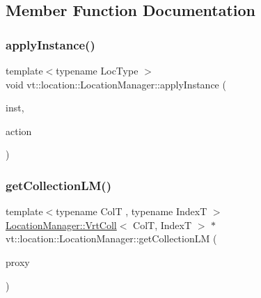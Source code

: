 \subsection{Member Function Documentation}
\mbox{\label{structvt_1_1location_1_1_location_manager_ae87fb969a0c0e2a45ca3ff15a0f01c00}} 
\subsubsection{\texorpdfstring{apply\+Instance()}{applyInstance()}}
{\footnotesize\ttfamily template$<$typename Loc\+Type $>$ \\
void vt\+::location\+::\+Location\+Manager\+::apply\+Instance (\begin{DoxyParamCaption}\item[{\hyperlink{namespacevt_1_1location_a4db6456e8024af2d23fc5ae560fef866}{Loc\+Inst\+Type} const}]{inst,  }\item[{\hyperlink{structvt_1_1location_1_1_location_manager_a6de3841092c537efc5fb8376128bfe18}{Action\+Loc\+Inst\+Type}$<$ Loc\+Type $>$}]{action }\end{DoxyParamCaption})\hspace{0.3cm}{\ttfamily [static]}}

\mbox{\label{structvt_1_1location_1_1_location_manager_a2d95ed25544679c16a84a173e84b92b6}} 
\subsubsection{\texorpdfstring{get\+Collection\+L\+M()}{getCollectionLM()}}
{\footnotesize\ttfamily template$<$typename ColT , typename IndexT $>$ \\
\hyperlink{structvt_1_1location_1_1_location_manager_a189fc3b436520c19aada9623a6b4a42e}{Location\+Manager\+::\+Vrt\+Coll}$<$ ColT, IndexT $>$ $\ast$ vt\+::location\+::\+Location\+Manager\+::get\+Collection\+LM (\begin{DoxyParamCaption}\item[{\hyperlink{namespacevt_a1b417dd5d684f045bb58a0ede70045ac}{Virtual\+Proxy\+Type} const \&}]{proxy }\end{DoxyParamCaption})}

